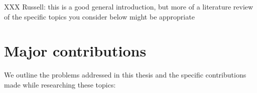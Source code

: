 \documentclass[12pt]{cmuthesis}
\begin{document}



XXX Russell: this is a good general introduction, but more of a literature review of the specific topics you consider below might be appropriate

\section{Major contributions}

We outline the problems addressed in this thesis and the specific contributions made while researching these topics:
\end{document}
